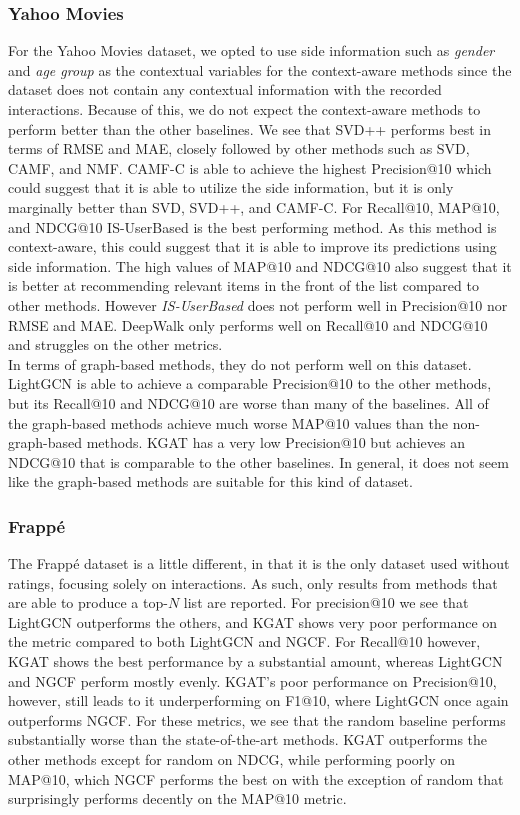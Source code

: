 \subsubsection{Yahoo Movies}
For the Yahoo Movies dataset, we opted to use side information such as \textit{gender} and \textit{age group} as the contextual variables for the context-aware methods since the dataset does not contain any contextual information with the recorded interactions.
Because of this, we do not expect the context-aware methods to perform better than the other baselines.
We see that SVD++ performs best in terms of RMSE and MAE, closely followed by other methods such as SVD, CAMF, and NMF.
CAMF-C is able to achieve the highest Precision@10 which could suggest that it is able to utilize the side information, but it is only marginally better than SVD, SVD++, and CAMF-C.
For Recall@10, MAP@10, and NDCG@10 IS-UserBased is the best performing method.
As this method is context-aware, this could suggest that it is able to improve its predictions using side information.
The high values of MAP@10 and NDCG@10 also suggest that it is better at recommending relevant items in the front of the list compared to other methods.
However \textit{IS-UserBased} does not perform well in Precision@10 nor RMSE and MAE.
DeepWalk only performs well on Recall@10 and NDCG@10 and struggles on the other metrics.
\\
In terms of graph-based methods, they do not perform well on this dataset.
LightGCN is able to achieve a comparable Precision@10 to the other methods, but its Recall@10 and NDCG@10 are worse than many of the baselines.
All of the graph-based methods achieve much worse MAP@10 values than the non-graph-based methods.
KGAT has a very low Precision@10 but achieves an NDCG@10 that is comparable to the other baselines.
In general, it does not seem like the graph-based methods are suitable for this kind of dataset.

\subsubsection{Frappé}
The Frappé dataset is a little different, in that it is the only dataset used without ratings, focusing solely on interactions.
As such, only results from methods that are able to produce a top-$N$ list are reported.
For precision@10 we see that LightGCN outperforms the others, and KGAT shows very poor performance on the metric compared to both LightGCN and NGCF.
For Recall@10 however, KGAT shows the best performance by a substantial amount, whereas LightGCN and NGCF perform mostly evenly.
KGAT's poor performance on Precision@10, however, still leads to it underperforming on F1@10, where LightGCN once again outperforms NGCF.
For these metrics, we see that the random baseline performs substantially worse than the state-of-the-art methods.
KGAT outperforms the other methods except for random on NDCG, while performing poorly on MAP@10, which NGCF performs the best on with the exception of random that surprisingly performs decently on the MAP@10 metric.
